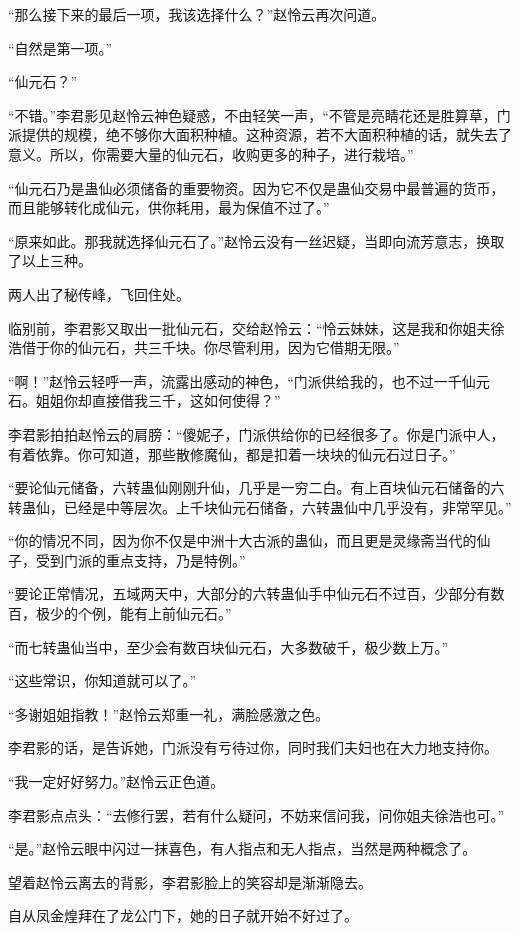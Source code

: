\begin{this_body}
“那么接下来的最后一项，我该选择什么？”赵怜云再次问道。

“自然是第一项。”

“仙元石？”

“不错。”李君影见赵怜云神色疑惑，不由轻笑一声，“不管是亮睛花还是胜算草，门派提供的规模，绝不够你大面积种植。这种资源，若不大面积种植的话，就失去了意义。所以，你需要大量的仙元石，收购更多的种子，进行栽培。”

“仙元石乃是蛊仙必须储备的重要物资。因为它不仅是蛊仙交易中最普遍的货币，而且能够转化成仙元，供你耗用，最为保值不过了。”

“原来如此。那我就选择仙元石了。”赵怜云没有一丝迟疑，当即向流芳意志，换取了以上三种。

两人出了秘传峰，飞回住处。

临别前，李君影又取出一批仙元石，交给赵怜云：“怜云妹妹，这是我和你姐夫徐浩借于你的仙元石，共三千块。你尽管利用，因为它借期无限。”

“啊！”赵怜云轻呼一声，流露出感动的神色，“门派供给我的，也不过一千仙元石。姐姐你却直接借我三千，这如何使得？”

李君影拍拍赵怜云的肩膀：“傻妮子，门派供给你的已经很多了。你是门派中人，有着依靠。你可知道，那些散修魔仙，都是扣着一块块的仙元石过日子。”

“要论仙元储备，六转蛊仙刚刚升仙，几乎是一穷二白。有上百块仙元石储备的六转蛊仙，已经是中等层次。上千块仙元石储备，六转蛊仙中几乎没有，非常罕见。”

“你的情况不同，因为你不仅是中洲十大古派的蛊仙，而且更是灵缘斋当代的仙子，受到门派的重点支持，乃是特例。”

“要论正常情况，五域两天中，大部分的六转蛊仙手中仙元石不过百，少部分有数百，极少的个例，能有上前仙元石。”

“而七转蛊仙当中，至少会有数百块仙元石，大多数破千，极少数上万。”

“这些常识，你知道就可以了。”

“多谢姐姐指教！”赵怜云郑重一礼，满脸感激之色。

李君影的话，是告诉她，门派没有亏待过你，同时我们夫妇也在大力地支持你。

“我一定好好努力。”赵怜云正色道。

李君影点点头：“去修行罢，若有什么疑问，不妨来信问我，问你姐夫徐浩也可。”

“是。”赵怜云眼中闪过一抹喜色，有人指点和无人指点，当然是两种概念了。

望着赵怜云离去的背影，李君影脸上的笑容却是渐渐隐去。

自从凤金煌拜在了龙公门下，她的日子就开始不好过了。


\end{this_body}
